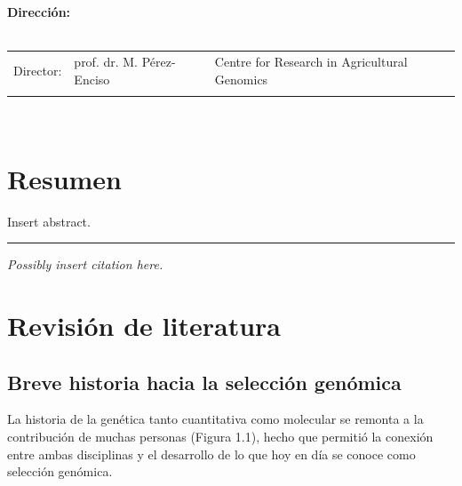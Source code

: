 \documentclass[11pt,spanish,a4paper,oneside,]{book} %
\begin{document}
\clearpage
\thispagestyle{empty}
\noindent\textbf{Dirección:}\\
\\
\noindent\begin{tabular}{@{}lll}

Director:
&  prof. dr. M. Pérez-Enciso & Centre for Research in Agricultural Genomics\\

\\
\end{tabular}\\



{
\hypersetup{linkcolor=black}
\setcounter{tocdepth}{1}
\tableofcontents
}
\mainmatter
\hypertarget{resumen}{%
\chapter{Resumen}\label{resumen}}

\noindent 
Insert abstract.

\begin{center}\rule{0.5\linewidth}{0.5pt}\end{center}

\vspace*{\fill}

\noindent
\emph{Possibly insert citation here.}
\newpage

\hypertarget{revisiuxf3n-de-literatura}{%
\chapter{Revisión de literatura}\label{revisiuxf3n-de-literatura}}

\hypertarget{breve-historia-hacia-la-selecciuxf3n-genuxf3mica}{%
\section{Breve historia hacia la selección genómica}\label{breve-historia-hacia-la-selecciuxf3n-genuxf3mica}}

La historia de la genética tanto cuantitativa como molecular se remonta a la contribución de muchas personas (Figura 1.1), hecho que permitió la conexión entre ambas disciplinas y el desarrollo de lo que hoy en día se conoce como selección genómica.
\end{document}
